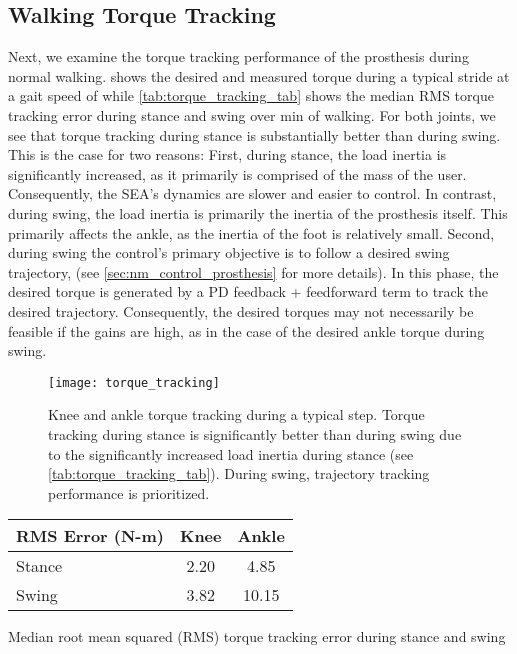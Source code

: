 \subsection{Walking Torque Tracking}
Next, we examine the torque tracking performance of the prosthesis during normal
walking.  shows the desired and measured torque
during a typical stride at a gait speed of  while
\cref{tab:torque_tracking_tab} shows the median RMS torque tracking error during
stance and swing over \unit[1]{min} of walking. For both joints, we see that
torque tracking during stance is substantially better than during swing.  This
is the case for two reasons: First, during stance, the load inertia is
significantly increased, as it primarily is comprised of the mass of the user.
Consequently, the SEA's dynamics are slower and easier to control. In contrast,
during swing, the load inertia is primarily the inertia of the prosthesis
itself. This primarily affects the ankle, as the inertia of the foot is
relatively small. Second, during swing the control's primary objective is to
follow a desired swing trajectory, (see \cref{sec:nm_control_prosthesis} for
more details). In this phase, the desired torque is generated by a PD feedback +
feedforward term to track the desired trajectory. Consequently, the desired
torques may not necessarily be feasible if the gains are high, as in the case of
the desired ankle torque during swing.
\begin{figure}[t]
    \centering 
    \texttt{[image: torque\_tracking]}
    \caption[Knee and ankle torque tracking during a typical step]{Knee and
    ankle torque tracking during a typical step. Torque tracking during stance
    is significantly better than during swing due to the significantly increased
    load inertia during stance (see \cref{tab:torque_tracking_tab}). During
    swing, trajectory tracking performance is
    prioritized.}\label{fig:torque_tracking_plot}
\end{figure}
\begin{margintable}[-1in]
    \centering
    \small
    \begin{tabular}{lcc}
        RMS Error (N-m) & Knee & Ankle \\
        \midrule
        Stance & 2.20 & 4.85  \\
        Swing  & 3.82 & 10.15 \\
    \end{tabular}
    \caption{Median root mean squared (RMS) torque tracking error during stance
    and swing}\label{tab:torque_tracking_tab}
\end{margintable}

